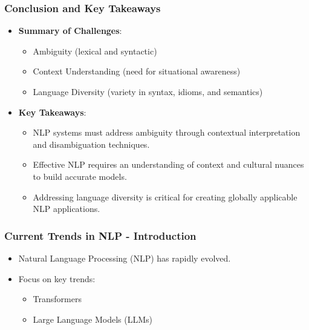 \documentclass{beamer}
\begin{document}
\begin{frame}[fragile]
    \frametitle{Conclusion and Key Takeaways}
    \begin{itemize}
        \item \textbf{Summary of Challenges}:
        \begin{itemize}
            \item Ambiguity (lexical and syntactic)
            \item Context Understanding (need for situational awareness)
            \item Language Diversity (variety in syntax, idioms, and semantics)
        \end{itemize}
        \item \textbf{Key Takeaways}:
        \begin{itemize}
            \item NLP systems must address ambiguity through contextual interpretation and disambiguation techniques.
            \item Effective NLP requires an understanding of context and cultural nuances to build accurate models.
            \item Addressing language diversity is critical for creating globally applicable NLP applications.
        \end{itemize}
    \end{itemize}
\end{frame}

\begin{frame}[fragile]
    \frametitle{Current Trends in NLP - Introduction}
    \begin{itemize}
        \item Natural Language Processing (NLP) has rapidly evolved.
        \item Focus on key trends: 
        \begin{itemize}
            \item Transformers
            \item Large Language Models (LLMs)
        \end{itemize}
    \end{itemize}
\end{frame}
\end{document}

